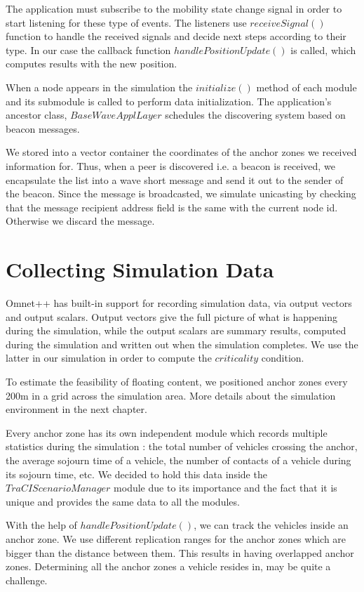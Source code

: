 The application must subscribe to the mobility state change signal in order
to start listening for these type of events. The listeners use $receiveSignal()$
function to handle the received signals and decide next steps according to their
type. In our case the callback function $handlePositionUpdate()$ is called, which
computes results with the new position.

When a node appears in the simulation the $initialize()$ method of each module
and its submodule is called to perform data initialization. The application's
ancestor class, $BaseWaveApplLayer$ schedules the discovering system based on
beacon messages.

We stored into a vector container the coordinates of the anchor zones we
received information for. Thus, when a peer is discovered i.e. a beacon is
received, we encapsulate the list into a wave short message and send it out to
the sender of the beacon. Since the message is broadcasted, we simulate
unicasting by checking that the message recipient address field is the same with
the current node id. Otherwise we discard the message.

\section {Collecting Simulation Data}

Omnet++ has built-in support for recording simulation data, via output vectors
and output scalars. Output vectors give the full picture of what is happening
during the simulation, while the output scalars are summary results, computed
during the simulation and written out when the simulation completes. We use the
latter in our simulation in order to compute the $criticality$ condition.

To estimate the feasibility of floating content, we positioned anchor zones
every 200m in a grid across the simulation area. More details about the
simulation environment in the next chapter.

Every anchor zone has its own independent module which records multiple
statistics during the simulation : the total number of vehicles crossing the
anchor, the average sojourn time of a vehicle, the number of contacts of a
vehicle during its sojourn time, etc. We decided to hold this data inside the
$TraCIScenarioManager$ module due to its importance and the fact that it is
unique and provides the same data to all the modules.

With the help of $handlePositionUpdate()$, we can track the vehicles inside an
anchor zone. We use different replication ranges for the anchor zones which are
bigger than the distance between them. This results in having overlapped anchor
zones. Determining all the anchor zones a vehicle resides in, may be quite a
challenge.

